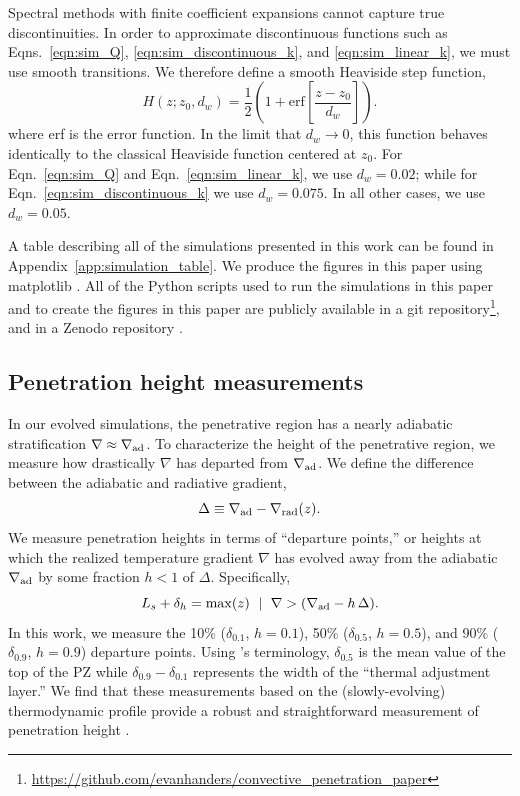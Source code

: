 \documentclass[twocolumn]{aastex631}
\newcommand{\gradrad}{\ensuremath{\nabla_{\rm{rad}}}}
\newcommand{\gradad}{\ensuremath{\nabla_{\rm{ad}}}}
\newcommand{\justgrad}{\ensuremath{\nabla}}
\begin{document}
Spectral methods with finite coefficient expansions cannot capture true discontinuities.
In order to approximate discontinuous functions such as Eqns.~\ref{eqn:sim_Q}, \ref{eqn:sim_discontinuous_k}, and \ref{eqn:sim_linear_k}, we must use smooth transitions.
We therefore define a smooth Heaviside step function,
\begin{equation}
H(z; z_0, d_w) = \frac{1}{2}\left(1 + \mathrm{erf}\left[\frac{z - z_0}{d_w}\right]\right).
\label{eqn:heaviside}
\end{equation}
where erf is the error function.
In the limit that $d_w \rightarrow 0$, this function behaves identically to the classical Heaviside function centered at $z_0$.
For Eqn.~\ref{eqn:sim_Q} and Eqn.~\ref{eqn:sim_linear_k}, we use $d_w = 0.02$; while for Eqn.~\ref{eqn:sim_discontinuous_k} we use $d_w = 0.075$.
In all other cases, we use $d_w = 0.05$.

A table describing all of the simulations presented in this work can be found in Appendix~\ref{app:simulation_table}.
We produce the figures in this paper using matplotlib \citep{hunter2007, mpl3.3.4}.
All of the Python scripts used to run the simulations in this paper and to create the figures in this paper are publicly available in a git repository\footnote{\url{https://github.com/evanhanders/convective_penetration_paper}}, and in a Zenodo repository \citep{supp}.

\subsection{Penetration height measurements}
In our evolved simulations, the penetrative region has a nearly adiabatic stratification $\justgrad \approx \gradad$.
To characterize the height of the penetrative region, we measure how drastically $\justgrad$ has departed from $\gradad$.
We define the difference between the adiabatic and radiative gradient,
\begin{equation}
\Delta \equiv \gradad - \gradrad(z).
\end{equation}
We measure penetration heights in terms of ``departure points,'' or heights at which the realized temperature gradient $\justgrad$ has evolved away from the adiabatic $\gradad$ by some fraction $h < 1$ of $\Delta$.
Specifically,
\begin{equation}
L_s + \delta_{h} = \mathrm{max}(z) \,\,\mid\,\, \justgrad > (\gradad - h\,\Delta).
\label{eqn:delta_p_measures}
\end{equation}
In this work, we measure the 10\% ($\delta_{0.1}$, $h=0.1$), 50\% ($\delta_{0.5}$, $h=0.5$), and 90\% ($\delta_{0.9}$, $h=0.9$) departure points.
Using \citet{zahn1991}'s terminology, $\delta_{0.5}$ is the mean value of the top of the PZ while $\delta_{0.9} - \delta_{0.1}$ represents the width of the ``thermal adjustment layer.''
We find that these measurements based on the (slowly-evolving) thermodynamic profile provide a robust and straightforward measurement of penetration height \citep[for a discussion of alternate measurement choices, see][]{pratt_etal_2017}.
\end{document}

